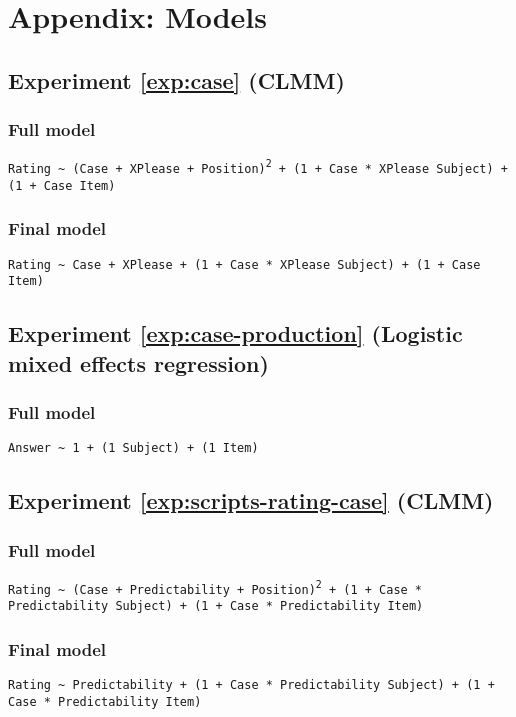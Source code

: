 \chapter*{Appendix: Models}
\renewcommand{\theequation}{A.\arabic{equation}}

\section*{Experiment \ref{exp:case} (CLMM)}

\subsection*{Full model}
\texttt{Rating \textasciitilde {} (Case + XPlease + Position)\textsuperscript{2} + (1 + Case * XPlease{} \textbar {} Subject) + (1 + Case{} \textbar {} Item)}

\subsection*{Final model}
\texttt{Rating \textasciitilde {} Case + XPlease + (1 + Case * XPlease{} \textbar {} Subject) + (1 + Case{} \textbar {} Item)}

\section*{Experiment \ref{exp:case-production} (Logistic mixed effects regression)}
\subsection*{Full model}
\texttt{Answer \textasciitilde {} 1 + (1{} \textbar {} Subject) + (1{} \textbar {} Item)}

\section*{Experiment \ref{exp:scripts-rating-case} (CLMM)}
\subsection*{Full model}
\texttt{Rating \textasciitilde {} (Case + Predictability + Position)\textsuperscript{2} + (1 + Case * Predictability{} \textbar {} Subject) + (1 + Case * Predictability{} \textbar {} Item)}

\subsection*{Final model}
\texttt{Rating \textasciitilde {} Predictability + (1 + Case * Predictability{} \textbar {} Subject) + (1 + Case * Predictability{} \textbar {} Item)}


